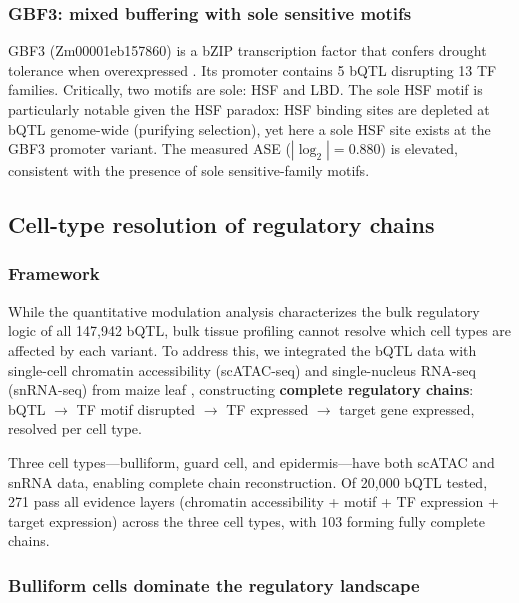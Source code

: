 \documentclass[11pt,a4paper]{article}
\begin{document}
\subsubsection{GBF3: mixed buffering with sole sensitive motifs}

GBF3 (Zm00001eb157860) is a bZIP transcription factor that confers drought tolerance when overexpressed \citep{ramegowda2017}. Its promoter contains 5 bQTL disrupting 13 TF families. Critically, two motifs are sole: HSF and LBD. The sole HSF motif is particularly notable given the HSF paradox: HSF binding sites are depleted at bQTL genome-wide (purifying selection), yet here a sole HSF site exists at the GBF3 promoter variant. The measured ASE ($|\log_2| = 0.880$) is elevated, consistent with the presence of sole sensitive-family motifs.

\subsection{Cell-type resolution of regulatory chains}

\subsubsection{Framework}

While the quantitative modulation analysis characterizes the bulk regulatory logic of all 147,942 bQTL, bulk tissue profiling cannot resolve which cell types are affected by each variant. To address this, we integrated the bQTL data with single-cell chromatin accessibility (scATAC-seq) and single-nucleus RNA-seq (snRNA-seq) from maize leaf \citep{marand2021}, constructing \textbf{complete regulatory chains}: bQTL $\rightarrow$ TF motif disrupted $\rightarrow$ TF expressed $\rightarrow$ target gene expressed, resolved per cell type.

Three cell types---bulliform, guard cell, and epidermis---have both scATAC and snRNA data, enabling complete chain reconstruction. Of 20,000 bQTL tested, 271 pass all evidence layers (chromatin accessibility + motif + TF expression + target expression) across the three cell types, with 103 forming fully complete chains.

\subsubsection{Bulliform cells dominate the regulatory landscape}
\end{document}
